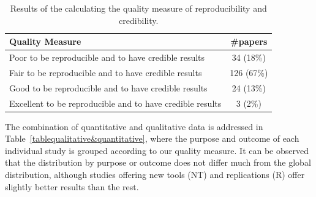 \documentclass[a4paper, 12pt]{book}
\begin{document}
 \begin{table}[!t]
\renewcommand{\arraystretch}{0.8}
\caption{Results of the calculating the quality measure of reproducibility and credibility.}
\label{tablequalitative}
\centering

\begin{tabular}{|l|c|}
\hline
Quality Measure & \#papers \\
\hline
\hline
Poor to be reproducible and to have credible results &  34 (18\%)\\
\hline
Fair to be reproducible and to have credible results & 126 (67\%)\\
\hline
Good to be reproducible and to have credible results & 24 (13\%)\\
\hline
Excellent to be reproducible and to have credible results & 3 (2\%)\\
\hline
\end{tabular}
\end{table}

The combination of quantitative and qualitative data is addressed in Table~\ref{tablequalitative&quantitative}, where the purpose and outcome of each individual study is grouped according to our quality measure.
It can be observed that the distribution by purpose or outcome does not differ much from the global distribution, although studies offering new tools (NT) and replications (R) offer slightly better results than the rest.
\end{document}
